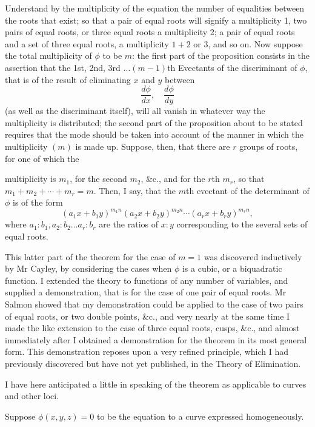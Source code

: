 \documentclass[11pt]{article}
\newcommand{\sourcepage}[1]{\marginpar{\scriptsize p.~#1}}
\begin{document}
Understand by the multiplicity of the equation the number of equalities between the roots that exist; so that a pair of equal roots will signify a multiplicity 1, two pairs of equal roots, or three equal roots a multiplicity 2; a pair of equal roots and a set of three equal roots, a multiplicity $1+2$ or 3, and so on. Now suppose the total multiplicity of $\phi$ to be $m$: the first part of the proposition consists in the assertion that the 1st, 2nd, 3rd $\ldots(m-1)$th Evectants of the discriminant of $\phi$, that is of the result of eliminating $x$ and $y$ between
\[
\frac{d\phi}{dx},\quad \frac{d\phi}{dy}
\]
(as well as the discriminant itself), will all vanish in whatever way the multiplicity is distributed; the second part of the proposition about to be stated requires that the mode should be taken into account of the manner in which the multiplicity $(m)$ is made up. Suppose, then, that there are $r$ groups of roots, for one of which the

\sourcepage{368}
multiplicity is $m_1$, for the second $m_2$, \&c., and for the $r$th $m_r$, so that $m_1+m_2+\cdots+m_r=m$. Then, I say, that the $m$th evectant of the determinant of $\phi$ is of the form
\[
(a_1x+b_1y)^{m_1n}(a_2x+b_2y)^{m_2n}\cdots(a_rx+b_ry)^{m_rn},
\]
where $a_1:b_1,a_2:b_2\ldots a_r:b_r$ are the ratios of $x:y$ corresponding to the several sets of equal roots.

This latter part of the theorem for the case of $m=1$ was discovered inductively by Mr Cayley, by considering the cases when $\phi$ is a cubic, or a biquadratic function. I extended the theory to functions of any number of variables, and supplied a demonstration, that is for the case of one pair of equal roots. Mr Salmon showed that my demonstration could be applied to the case of two pairs of equal roots, or two double points, \&c., and very nearly at the same time I made the like extension to the case of three equal roots, cusps, \&c., and almost immediately after I obtained a demonstration for the theorem in its most general form. This demonstration reposes upon a very refined principle, which I had previously discovered but have not yet published, in the Theory of Elimination.

I have here anticipated a little in speaking of the theorem as applicable to curves and other loci.

Suppose $\phi(x,y,z)=0$ to be the equation to a curve expressed homogeneously.
\end{document}
